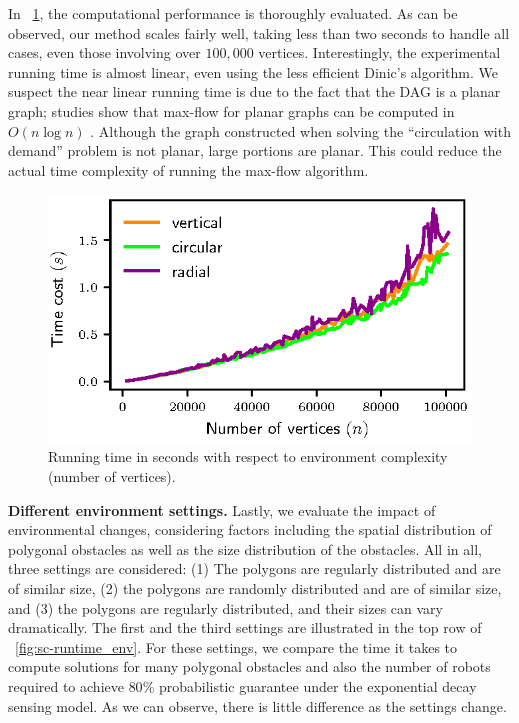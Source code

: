 In ~\ref{fig:sc-simulations_runtime}, the computational performance is thoroughly 
evaluated. As can be observed, our method scales fairly well, taking less than two seconds
to handle all cases, even those involving over $100,000$ vertices. 
%
Interestingly, the experimental running time is almost linear, even using the less efficient Dinic's algorithm. 
%
We suspect the near linear running time is due to the fact that the DAG is 
a planar graph; studies show that max-flow for planar graphs can be computed 
in $O(n\log n)$ \cite{borradaile2009n}. 
%
Although the graph constructed when solving the ``circulation with demand'' problem is not planar, large portions are planar. 
This could reduce the actual time complexity of running the max-flow algorithm.

\begin{figure}[h]
\vspace{2mm}
    \centering
    \includegraphics[width=0.5\linewidth]{chapters/sc/fig/runtime.eps}
    \caption{Running time in seconds with respect to environment complexity (number of vertices). }
    \label{fig:sc-simulations_runtime}
\end{figure}

\textbf{Different environment settings.}
Lastly, we evaluate the impact of environmental changes, considering factors including the spatial distribution of polygonal obstacles as well as 
the size distribution of the obstacles. 
%
All in all, three settings are considered: (1) The polygons are regularly distributed 
and are of similar size, (2) the polygons are randomly distributed and are of similar size,
and (3) the polygons are regularly distributed, and their sizes can vary dramatically. 
The first and the third settings are illustrated in the top row of ~\ref{fig:sc-runtime_env}.
%
For these settings, we compare the time it takes to compute solutions for many polygonal
obstacles and also the number of robots required to achieve $80\%$ probabilistic guarantee 
under the exponential decay sensing model.
%
As we can observe, there is little difference as the settings change. 

